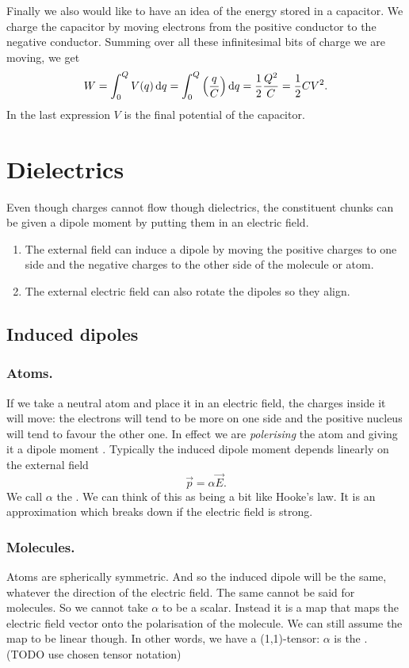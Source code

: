 Finally we also would like to have an idea of the energy stored in a capacitor. We charge the capacitor by moving electrons from the positive conductor to the negative conductor.
Summing over all these infinitesimal bits of charge we are moving, we get
\[ W = \int_0^QV(q) \operatorname{d \!}{q} = \int_0^Q \left(\frac{q}{C}\right)\operatorname{d \!}{q} = \frac{1}{2}\frac{Q^2}{C} = \frac{1}{2}CV^2. \]
In the last expression $V$ is the final potential of the capacitor.

\section{Dielectrics}
Even though charges cannot flow though dielectrics, the constituent chunks can be given a dipole moment by putting them in an electric field.
\begin{enumerate}
\item The external field can induce a dipole by moving the positive charges to one side and the negative charges to the other side of the molecule or atom.
\item The external electric field can also rotate the dipoles so they align.
\end{enumerate}

\subsection{Induced dipoles}
\subsubsection{Atoms.}
If we take a neutral atom and place it in an electric field, the charges inside it will move: the electrons will tend to be more on one side and the positive nucleus will tend to favour the other one. In effect we are \textit{polerising} the atom and giving it a dipole moment . Typically the induced dipole moment depends linearly on the external field
\[ \vec{p} = \alpha \vec{E}. \]
We call $\alpha$ the . We can think of this as being a bit like Hooke's law. It is an approximation which breaks down if the electric field is strong.

\subsubsection{Molecules.}
Atoms are spherically symmetric. And so the induced dipole will be the same, whatever the direction of the electric field. The same cannot be said for molecules. So we cannot take $\alpha$ to be a scalar. Instead it is a map that maps the electric field vector onto the polarisation of the molecule. We can still assume the map to be linear though. In other words, we have a (1,1)-tensor: $\alpha$ is the . (TODO use chosen tensor notation)

